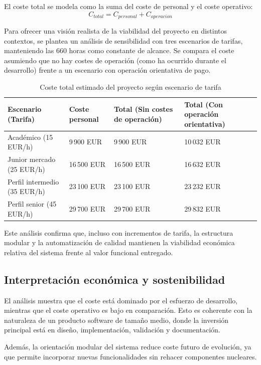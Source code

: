 El coste total se modela como la suma del coste de personal y el coste operativo:
\[
C_{total} = C_{personal} + C_{operacion}
\]

Para ofrecer una visi\'on realista de la viabilidad del proyecto en distintos contextos, se plantea un an\'alisis de sensibilidad con tres escenarios de tarifas, manteniendo las 660 horas como constante de alcance. Se compara el coste asumiendo que no hay costes de operaci\'on (como ha ocurrido durante el desarrollo) frente a un escenario con operaci\'on orientativa de pago.

\begin{table}[!htbp]
\centering
\begin{tabular}{|P{3.5cm}|P{2.2cm}|P{3.5cm}|P{3.5cm}|}
\hline
\textbf{Escenario (Tarifa)} & \textbf{Coste personal} & \textbf{Total (Sin costes de operaci\'on)} & \textbf{Total (Con operaci\'on orientativa)} \\
\hline
Acad\'emico (15 EUR/h) & 9\,900 EUR & 9\,900 EUR & 10\,032 EUR \\
\hline
Junior mercado (25 EUR/h) & 16\,500 EUR & 16\,500 EUR & 16\,632 EUR \\
\hline
Perfil intermedio (35 EUR/h) & 23\,100 EUR & 23\,100 EUR & 23\,232 EUR \\
\hline
Perfil senior (45 EUR/h) & 29\,700 EUR & 29\,700 EUR & 29\,832 EUR \\
\hline
\end{tabular}
\caption{Coste total estimado del proyecto seg\'un escenario de tarifa}
\label{tab:coste-total-sensibilidad}
\end{table}

Este an\'alisis confirma que,
incluso con incrementos de tarifa,
la estructura modular y la automatizaci\'on de calidad mantienen
la viabilidad econ\'omica relativa del sistema frente al valor funcional entregado.

\subsection{Interpretaci\'on econ\'omica y sostenibilidad}

El an\'alisis muestra que el coste est\'a dominado por el esfuerzo de desarrollo,
mientras que el coste operativo es bajo en comparaci\'on.
Esto es coherente con la naturaleza de un producto software de tama\~no medio,
donde la inversi\'on principal est\'a en dise\~no, implementaci\'on, validaci\'on y documentaci\'on.

Adem\'as, la orientaci\'on modular del sistema reduce coste futuro de evoluci\'on,
ya que permite incorporar nuevas funcionalidades sin rehacer componentes nucleares.

